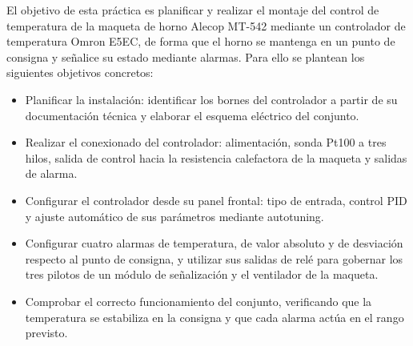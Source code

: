 \clearpage
{}

El objetivo de esta práctica es planificar y realizar el montaje del control de temperatura de la maqueta de horno Alecop MT-542 mediante un controlador de temperatura Omron E5EC, de forma que el horno se mantenga en un punto de consigna y señalice su estado mediante alarmas. Para ello se plantean los siguientes objetivos concretos:

\begin{itemize}
	\item Planificar la instalación: identificar los bornes del controlador a partir de su documentación técnica y elaborar el esquema eléctrico del conjunto.
	\item Realizar el conexionado del controlador: alimentación, sonda Pt100 a tres hilos, salida de control hacia la resistencia calefactora de la maqueta y salidas de alarma.
	\item Configurar el controlador desde su panel frontal: tipo de entrada, control PID y ajuste automático de sus parámetros mediante autotuning.
	\item Configurar cuatro alarmas de temperatura, de valor absoluto y de desviación respecto al punto de consigna, y utilizar sus salidas de relé para gobernar los tres pilotos de un módulo de señalización y el ventilador de la maqueta.
	\item Comprobar el correcto funcionamiento del conjunto, verificando que la temperatura se estabiliza en la consigna y que cada alarma actúa en el rango previsto.
\end{itemize}
